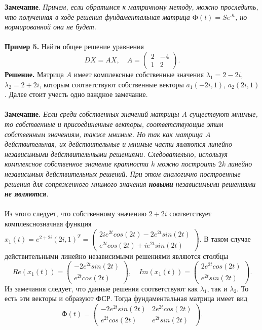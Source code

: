 \documentclass[a4paper, 12pt]{article}
\newcommand{\FI}{\text{Ф}}
\begin{document}
\textbf{Замечание}. \textit{Причем, если обратимся к матричному методу, можно проследить, что полученная в ходе решения фундаментальная матрица $\FI(t) = Se^{Jt}$, но нормированной она не будет.}\\\\
\textbf{Пример 5.} Найти общее решение уравнения $$DX = AX, \quad A = \begin{pmatrix}
	2 & -4\\
	1 & 2
\end{pmatrix}.$$
\textbf{Решение.} Матрица $A$ имеет комплексные собственные значения $\lambda_1 = 2-2i$, $\lambda_2 = 2+2i$, которым соответствуют собственные векторы $a_1(-2i, 1)$, $a_2(2i, 1)$. Далее стоит учесть одно важдное замечание.\\\\
\textbf{Замечание.} \textit{Если среди собственных значений матрицы $A$ существуют мнимые, то собственные и присоединенные векторы, соответствующие этим собственным значениям, также мнимые. Но так как матрица $A$ действительная, их действительные и мнимые части являются линейно независимыми действительными решениями. Следовательно, используя комплексное собственное значение кратности $k$ можно построить $2k$ линейно независимых действительных решений. При этом аналогично построенные решения для сопряженного мнимого значения \textbf{новыми} независимыми решениями \textbf{не являются}.} \\\\
Из этого следует, что собственному значению $2+ 2i$ соответствует комплекснозначная функция $x_1(t) = e^{2+2i}(2i, 1)^T = \begin{pmatrix}
	2ie^{2t}cos(2t) -2e^{2t}sin(2t)\\
	e^{2t}cos(2t) + ie^{2t}sin(2t)
\end{pmatrix}$. В таком случае действительными линейно независимыми решениями являются столбцы $$Re(x_1(t)) = \begin{pmatrix}
-2e^{2t}sin(2t)\\
e^{2t}cos(2t)
\end{pmatrix}, \quad Im(x_1(t)) = \begin{pmatrix}
2e^{2t}cos(2t)\\
e^{2t}sin(2t)
\end{pmatrix}.$$
Из замечания следует, что данные решения соответствуют как $\lambda_1$, так и $\lambda_2$. То есть эти векторы и образуют ФСР. Тогда фундаментальная матрица имеет вид
$$\FI(t) = \begin{pmatrix}
	-2e^{2t}sin(2t) & 2e^{2t}cos(2t)\\
	e^{2t}cos(2t) & e^{2t}sin(2t)
\end{pmatrix}.$$
\end{document}

